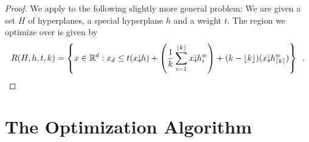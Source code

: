 \documentclass[lotsofwhite]{patmorin}
\newcommand{\drop}{\!\!\downarrow\!\!}
\begin{document}
\begin{proof}
We apply  to the following slightly more general problem:
We are given a set $H$ of hyperplanes, a special hyperplane $h$ and a
weight $t$.  The region we optimize over is given by 
\[
    R(H,h,t,k) = \left\{x\in\mathbb{R}^d: x_d \le 
t(x\drop h)+\left(\frac{1}{k}\sum_{i=1}^{\floor{k}} x\drop h_i^w\right) +
          (k-\floor{k})(x\drop h_{\ceil{k}}^w) \right\} \enspace .
\]

\end{proof}


\section{The Optimization Algorithm}
\end{document}
